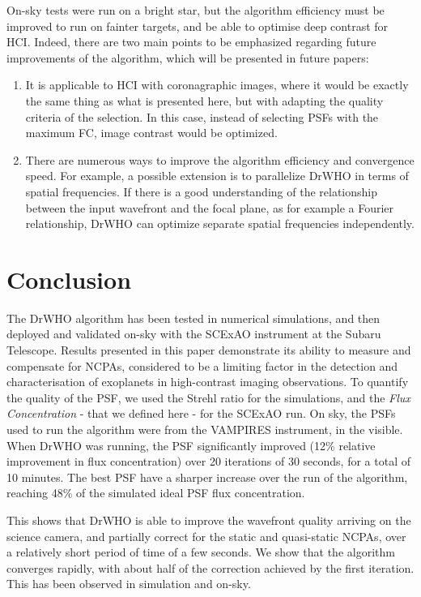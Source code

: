 \documentclass[twocolumn]{aa}
\begin{document}
On-sky tests were run on a bright star, but the algorithm efficiency must be improved to run on fainter targets, and be able to optimise deep contrast for HCI. Indeed, there are two main points to be emphasized regarding future improvements of the algorithm, which will be presented in future papers: 
\begin{enumerate}
    \item It is applicable to HCI with coronagraphic images, where it would be exactly the same thing as what is presented here, but with adapting the quality criteria of the selection. In this case, instead of selecting PSFs with the maximum FC, image contrast would be optimized.
    \item There are numerous ways to improve the algorithm efficiency and convergence speed. For example, a possible extension is to parallelize DrWHO in terms of spatial frequencies. If there is a good understanding of the relationship between the input wavefront and the focal plane, as for example a Fourier relationship, DrWHO can optimize separate spatial frequencies independently. 

\end{enumerate}


\section{Conclusion}

The DrWHO algorithm has been tested in numerical simulations, and then deployed and validated on-sky with the SCExAO instrument at the Subaru Telescope. Results presented in this paper demonstrate its ability to measure and compensate for NCPAs, considered to be a limiting factor in the detection and characterisation of exoplanets in high-contrast imaging observations. To quantify the quality of the PSF, we used the Strehl ratio for the simulations, and the \textit{Flux Concentration} - that we defined here - for the SCExAO run. On sky, the PSFs used to run the algorithm were from the VAMPIRES instrument, in the visible. When DrWHO was running, the PSF significantly improved (12\% relative improvement in flux concentration) over 20 iterations of 30 seconds, for a total of 10 minutes. The best PSF have a sharper increase over the run of the algorithm, reaching 48\% of the simulated ideal PSF flux concentration.

This shows that DrWHO is able to improve the wavefront quality arriving on the science camera, and partially correct for the static and quasi-static NCPAs, over a relatively short period of time of a few seconds. We show that the algorithm converges rapidly, with about half of the correction achieved by the first iteration. This has been observed in simulation and on-sky.
\end{document}
